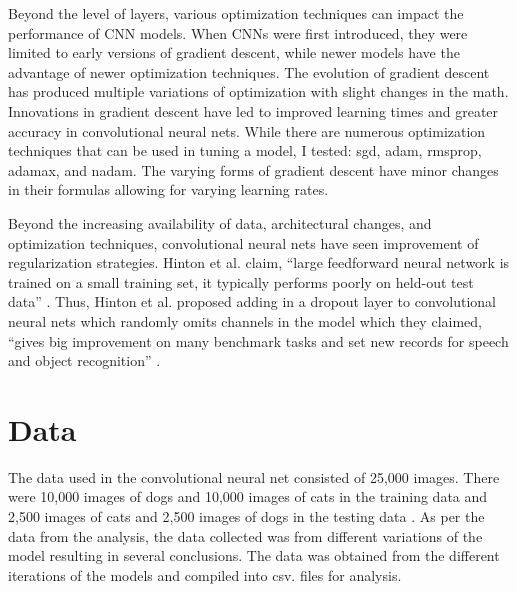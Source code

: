 \documentclass[12pt,english]{article}
\begin{document}
Beyond the level of layers, various optimization techniques can impact the performance of CNN models. When CNNs were first introduced, they were limited to early versions of gradient descent, while newer models have the advantage of newer optimization techniques. The evolution of gradient descent has produced multiple variations of optimization with slight changes in the math. Innovations in gradient descent have led to improved learning times and greater accuracy in convolutional neural nets. While there are numerous optimization techniques that can be used in tuning a model, I tested: sgd, adam, rmsprop, adamax, and nadam. The varying forms of gradient descent have minor changes in their formulas allowing for varying learning rates. \par

Beyond the increasing availability of data, architectural changes, and optimization techniques, convolutional neural nets have seen improvement of regularization strategies. Hinton et al. claim, ``large feedforward neural network is trained on a small training set, it typically performs poorly on held-out test data'' \citep{DBLP:journals/corr/abs-1207-0580}. Thus, Hinton et al. proposed adding in a dropout layer to convolutional neural nets which randomly omits channels in the model which they claimed, ``gives big improvement on many benchmark tasks and set new records for speech and object recognition'' \citep{DBLP:journals/corr/abs-1207-0580}.\par


\section{Data}
The data used in the convolutional neural net consisted of 25,000 images. There were 10,000 images of dogs and 10,000 images of cats in the training data and 2,500 images of cats and 2,500 images of dogs in the testing data \citep{anudc:4896}. As per the data from the analysis, the data collected was from different variations of the model resulting in several conclusions. The data was obtained from the different iterations of the models and compiled into csv. files for analysis.\par
\end{document}
